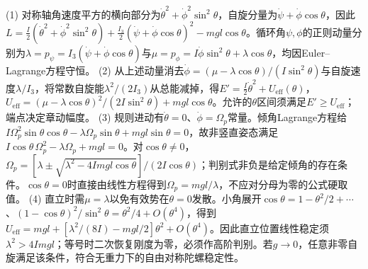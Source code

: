 (1) 对称轴角速度平方的横向部分为\(\dot\theta^2+\dot\phi^2\sin^2\theta\)，自旋分量为\(\dot\psi+\dot\phi\cos\theta\)，因此\(L=\frac I2(\dot\theta^2+\dot\phi^2\sin^2\theta)+\frac{I_3}2(\dot\psi+\dot\phi\cos\theta)^2-mgl\cos\theta\)。循环角\(\psi,\phi\)的正则动量分别为\(\lambda=p_\psi=I_3(\dot\psi+\dot\phi\cos\theta)\)与\(\mu=p_\phi=I\dot\phi\sin^2\theta+\lambda\cos\theta\)，均因Euler–Lagrange方程守恒。
(2) 从上述动量消去\(\dot\phi=(\mu-\lambda\cos\theta)/(I\sin^2\theta)\)与自旋速度\(\lambda/I_3\)，将常数自旋能\(\lambda^2/(2I_3)\)从总能减掉，得\(E'=\frac I2\dot\theta^2+U_{\mathrm{eff}}(\theta)\)，\(U_{\mathrm{eff}}=(\mu-\lambda\cos\theta)^2/(2I\sin^2\theta)+mgl\cos\theta\)。允许的\(\theta\)区间须满足\(E'\ge U_{\mathrm{eff}}\)；端点决定章动幅度。
(3) 规则进动有\(\dot\theta=0\)、\(\dot\phi=\Omega_p\)常量。倾角Lagrange方程给\(I\Omega_p^2\sin\theta\cos\theta-\lambda\Omega_p\sin\theta+mgl\sin\theta=0\)，故非竖直姿态满足\(I\cos\theta\,\Omega_p^2-\lambda\Omega_p+mgl=0\)。对\(\cos\theta\ne0\)，\(\Omega_p=[\lambda\pm\sqrt{\lambda^2-4Imgl\cos\theta}]/(2I\cos\theta)\)；判别式非负是给定倾角的存在条件。\(\cos\theta=0\)时直接由线性方程得到\(\Omega_p=mgl/\lambda\)，不应对分母为零的公式硬取值。
(4) 直立时需\(\mu=\lambda\)以免有效势在\(\theta=0\)发散。小角展开\(\cos\theta=1-\theta^2/2+\cdots\)、\((1-\cos\theta)^2/\sin^2\theta=\theta^2/4+O(\theta^4)\)，得到\(U_{\mathrm{eff}}=mgl+[\lambda^2/(8I)-mgl/2]\theta^2+O(\theta^4)\)。因此直立位置线性稳定须\(\lambda^2>4Imgl\)；等号时二次恢复刚度为零，必须作高阶判别。若\(g\to0\)，任意非零自旋满足该条件，符合无重力下的自由对称陀螺稳定性。
